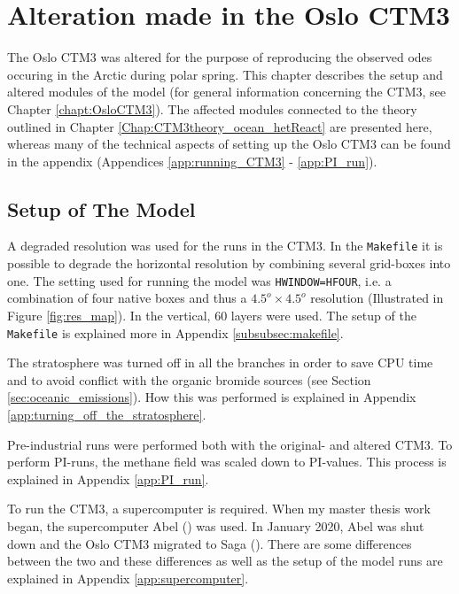 \setcounter{chapter}{4}
\chapter{Alteration made in the Oslo CTM3}\label{chap:CTM3_Setup}

The Oslo CTM3 was altered for the purpose of reproducing the observed \acrshort{ode}s occuring in the Arctic during polar spring. This chapter describes the setup and altered modules of the model (for general information concerning the CTM3, see Chapter \ref{chapt:OsloCTM3}). The affected modules connected to the theory outlined in Chapter \ref{Chap:CTM3theory_ocean_hetReact} are presented here, whereas many of the technical aspects of setting up the Oslo CTM3 can be found in the appendix (Appendices \ref{app:running_CTM3} - \ref{app:PI_run}).

\section{Setup of The Model}

A degraded resolution was used for the runs in the CTM3. In the \texttt{Makefile} it is possible to degrade the horizontal resolution by combining several grid-boxes into one. The setting used for running the model was \texttt{HWINDOW=HFOUR}, i.e. a combination of four native boxes and thus a $4.5^o \times 4.5^o$ resolution (Illustrated in Figure \ref{fig:res_map}). In the vertical, 60 layers were used. The setup of the \texttt{Makefile} is explained more in Appendix \ref{subsubsec:makefile}. 

\medskip

The stratosphere was turned off in all the branches in order to save CPU time and to avoid conflict with the organic bromide sources (see Section \ref{sec:oceanic_emissions}). How this was performed is explained in Appendix \ref{app:turning_off_the_stratosphere}. 

\medskip

Pre-industrial runs were performed both with the original- and altered CTM3. To perform PI-runs, the methane field was scaled down to PI-values. This process is explained in Appendix \ref{app:PI_run}.




\medskip

To run the CTM3, a supercomputer is required. When my master thesis work began, the supercomputer Abel (\cite{abel}) was used. In January 2020, Abel was shut down and the Oslo CTM3 migrated to Saga (\cite{saga}). There are some differences between the two  and these differences as well as the setup of the model runs are explained in Appendix \ref{app:supercomputer}. 


